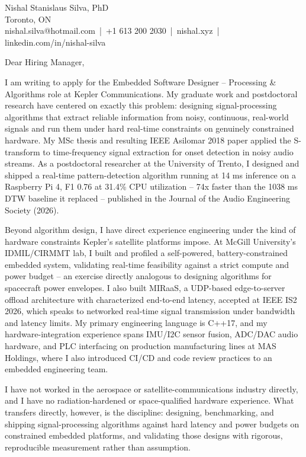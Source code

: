\documentclass[11pt]{article}
\begin{document}
\pagestyle{empty}

\noindent
Nishal Stanislaus Silva, PhD \\
Toronto, ON \\
nishal.silva@hotmail.com \,|\, +1 613 200 2030 \,|\, nishal.xyz \,|\, linkedin.com/in/nishal-silva

\vspace{1.5em}
\noindent Dear Hiring Manager,

\vspace{1em}
\noindent I am writing to apply for the Embedded Software Designer -- Processing \& Algorithms role at Kepler Communications. My graduate work and postdoctoral research have centered on exactly this problem: designing signal-processing algorithms that extract reliable information from noisy, continuous, real-world signals and run them under hard real-time constraints on genuinely constrained hardware. My MSc thesis and resulting IEEE Asilomar 2018 paper applied the S-transform to time-frequency signal extraction for onset detection in noisy audio streams. As a postdoctoral researcher at the University of Trento, I designed and shipped a real-time pattern-detection algorithm running at 14 ms inference on a Raspberry Pi 4, F1 0.76 at 31.4\% CPU utilization -- 74x faster than the 1038 ms DTW baseline it replaced -- published in the Journal of the Audio Engineering Society (2026).

\vspace{1em}
\noindent Beyond algorithm design, I have direct experience engineering under the kind of hardware constraints Kepler's satellite platforms impose. At McGill University's IDMIL/CIRMMT lab, I built and profiled a self-powered, battery-constrained embedded system, validating real-time feasibility against a strict compute and power budget -- an exercise directly analogous to designing algorithms for spacecraft power envelopes. I also built MIRaaS, a UDP-based edge-to-server offload architecture with characterized end-to-end latency, accepted at IEEE IS2 2026, which speaks to networked real-time signal transmission under bandwidth and latency limits. My primary engineering language is C++17, and my hardware-integration experience spans IMU/I2C sensor fusion, ADC/DAC audio hardware, and PLC interfacing on production manufacturing lines at MAS Holdings, where I also introduced CI/CD and code review practices to an embedded engineering team.

\vspace{1em}
\noindent I have not worked in the aerospace or satellite-communications industry directly, and I have no radiation-hardened or space-qualified hardware experience. What transfers directly, however, is the discipline: designing, benchmarking, and shipping signal-processing algorithms against hard latency and power budgets on constrained embedded platforms, and validating those designs with rigorous, reproducible measurement rather than assumption.
\end{document}
